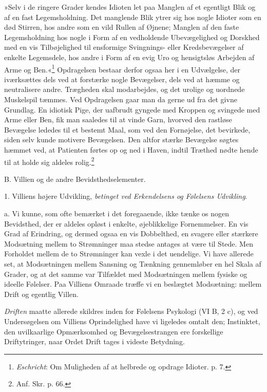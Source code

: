 \documentclass[12pt,a4paper,openany]{book}
\newcommand{\opage}[1]{\marginnote{\footnotesize\textit{[#1]}}}
\begin{document}
»Selv i de ringere Grader kendes Idioten let paa Manglen af et egentligt
Blik og af en fast Legemsholdning. Det
\opage{379}manglende Blik ytrer sig hos nogle Idioter som en død
Stirren, hos andre som en vild Rullen af Øjnene; Manglen af den faste
Legemsholdning hos nogle i Form af en vedholdende Ubevægelighed og
Dorskhed med en vis Tilbøjelighed til ensformige Svingnings- eller
Kredsbevægelser af enkelte Legemsdele, hos andre i Form af en evig Uro
og hensigtsløs Arbejden af Arme og Ben.«\footnote[1]{\emph{Eschricht}:
Om Muligheden af at helbrede og opdrage Idioter. p. 7.} Opdragelsen
bestaar derfor ogsaa her i en Udvælgelse, der iværksættes dels ved at
forstærke nogle Bevægelser, dels ved at hæmme og neutralisere andre.
Trægheden skal modarbejdes, og det urolige og uordnede Muskelspil
tæmmes. Ved Opdragelsen gaar man da gerne ud fra det givne Grundlag. En
idiotisk Pige, der uafbrudt gyngede med Kroppen og svingede med Arme
eller Ben, fik man saaledes til at vinde Garn, hvorved den rastløse
Bevægelse lededes til et bestemt Maal, som ved den Fornøjelse, det
bevirkede, siden selv kunde motivere Bevægelsen. Den altfor stærke
Bevægelse søgtes hæmmet ved, at Patienten førtes op og ned i Haven,
indtil Træthed nødte hende til at holde sig aldeles
rolig.\footnote[2]{Anf. Skr. p. 66.}

\begin{center}B. Villien og de andre Bevidsthedselementer.\end{center}

1. Villiens højere Udvikling, \emph{betinget ved Erkendelsens og
Følelsens Udvikling}.

a. Vi kunne, som ofte bemærket i det foregaaende, ikke tænke os nogen
Bevidsthed, der er aldeles opløst i enkelte, øjeblikkelige Fornemmelser.
En vis Grad af Erindring, og dermed ogsaa en vis Dobbelthed, en svagere
eller stærkere Modsætning mellem to Strømninger maa stedse antages at
være til Stede. Men Forholdet mellem de to Strømninger kan vexle i det
uendelige. Vi have allerede set, at Modsætningen mellem Sansning og
Tænkning gennemløber en hel Skala af Grader, og at det samme var
Tilfældet med Modsætningen mellem fysiske og ideelle Følelser. Paa
Villiens Omraade træffe vi en beslægtet Modsætning: mellem Drift og
egentlig Villen.


\opage{380}\emph{Driften} maatte allerede skildres inden for Følelsens
Psykologi (VI B, 2 c), og ved Undersøgelsen om Villiens Oprindelighed
have vi ligeledes omtalt den; Instinktet, den uvilkaarlige Opmærksomhed
og Bevægelsestrangen ere forskellige Driftytringer, naar Ordet Drift
tages i videste Betydning.
\end{document}
